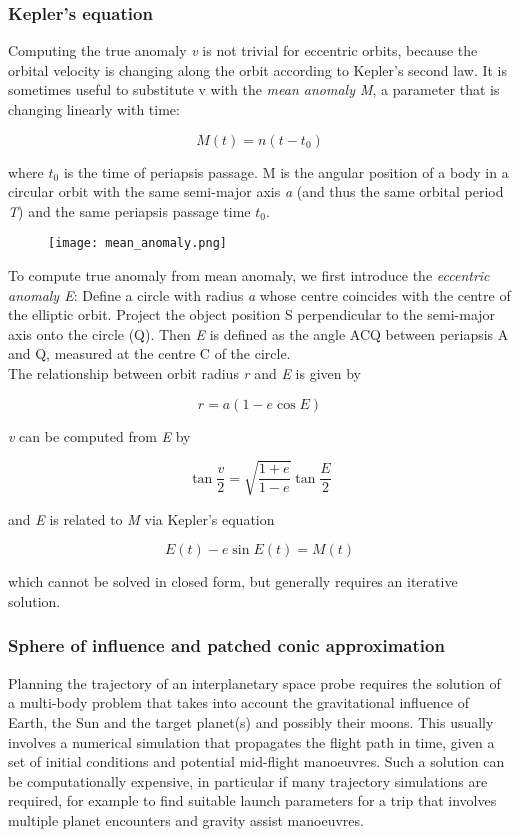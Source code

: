 \documentclass[Orbiter User Manual.tex]{subfiles}
\begin{document}
\subsubsection{Kepler's equation}
Computing the true anomaly \textit{v} is not trivial for eccentric orbits, because the orbital velocity is changing along the orbit according to Kepler's second law. It is sometimes useful to substitute v with the \textit{mean anomaly M}, a parameter that is changing linearly with time:

\[ M(t) = n(t - t_{0}) \]

\noindent
where $t_{0}$ is the time of periapsis passage. M is the angular position of a body in a circular orbit with the same semi-major axis \textit{a} (and thus the same orbital period \textit{T}) and the same periapsis passage time $t_{0}$.

\begin{figure}[H]
	\centering
	\texttt{[image: mean\_anomaly.png]}
\end{figure}

\noindent
To compute true anomaly from mean anomaly, we first introduce the \textit{eccentric anomaly E}: Define a circle with radius \textit{a} whose centre coincides with the centre of the elliptic orbit. Project the object position S perpendicular to the semi-major axis onto the circle (Q). Then \textit{E} is defined as the angle ACQ between periapsis A and Q, measured at the centre C of the circle.\\
The relationship between orbit radius \textit{r} and \textit{E} is given by

\[ r = a (1 - e \cos E) \]

\noindent
\textit{v} can be computed from \textit{E} by

\[ \tan \frac{v}{2} = \sqrt{\frac{1 + e}{1 - e}} \tan \frac{E}{2} \]

\noindent
and \textit{E} is related to \textit{M} via Kepler's equation

\[ E(t) - e \sin E(t) = M(t) \]

\noindent
which cannot be solved in closed form, but generally requires an iterative solution.

\subsubsection{Sphere of influence and patched conic approximation}
Planning the trajectory of an interplanetary space probe requires the solution of a multi-body problem that takes into account the gravitational influence of Earth, the Sun and the target planet(s) and possibly their moons. This usually involves a numerical simulation that propagates the flight path in time, given a set of initial conditions and potential mid-flight manoeuvres. Such a solution can be computationally expensive, in particular if many trajectory simulations are required, for example to find suitable launch parameters for a trip that involves multiple planet encounters and gravity assist manoeuvres.
\end{document}
